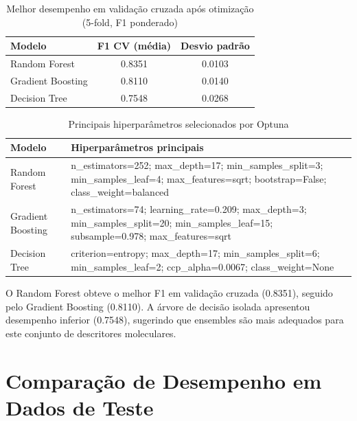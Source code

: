 \documentclass[12pt,a4paper]{article}
\begin{document}
\begin{table}[H]
\centering
\caption{Melhor desempenho em validação cruzada após otimização (5-fold, F1 ponderado)}
\label{tab:t2_cv_results}
\small
\begin{tabular}{@{}lcc@{}}
\toprule
\textbf{Modelo} & \textbf{F1 CV (média)} & \textbf{Desvio padrão} \\
\midrule
Random Forest & 0.8351 & 0.0103 \\
Gradient Boosting & 0.8110 & 0.0140 \\
Decision Tree & 0.7548 & 0.0268 \\
\bottomrule
\end{tabular}
\end{table}

\begin{table}[H]
\centering
\caption{Principais hiperparâmetros selecionados por Optuna}
\label{tab:t2_best_params}
\footnotesize
\renewcommand{\arraystretch}{1.2}
\begin{tabular}{@{}lp{10.5cm}@{}}
\toprule
\textbf{Modelo} & \textbf{Hiperparâmetros principais} \\
\midrule
Random Forest &
n\_estimators=252; max\_depth=17; min\_samples\_split=3; min\_samples\_leaf=4;\newline
max\_features=sqrt; bootstrap=False; class\_weight=balanced \\
Gradient Boosting &
n\_estimators=74; learning\_rate=0.209; max\_depth=3; min\_samples\_split=20;\newline
min\_samples\_leaf=15; subsample=0.978; max\_features=sqrt \\
Decision Tree &
criterion=entropy; max\_depth=17; min\_samples\_split=6; min\_samples\_leaf=2;\newline
ccp\_alpha=0.0067; class\_weight=None \\
\bottomrule
\end{tabular}
\end{table}

O Random Forest obteve o melhor F1 em validação cruzada (0.8351), seguido pelo Gradient Boosting (0.8110). A árvore de decisão isolada apresentou desempenho inferior (0.7548), sugerindo que ensembles são mais adequados para este conjunto de descritores moleculares.

\section{Comparação de Desempenho em Dados de Teste}
\end{document}
